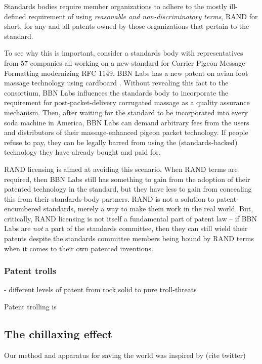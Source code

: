 \documentclass[acmtocl]%
{boviktrans}
\begin{document}
Standards bodies require member organizations to adhere to the mostly
ill-defined requirement of using {\it reasonable and
  non-discriminatory terms}, RAND for short, for any and all patents
owned by those organizations that pertain to the standard.

To see why this is important, consider a standards body with
representatives from 57 companies all working on a new standard for
Carrier Pigeon Message Formatting modernizing RFC 1149. BBN Labs has a
new patent on avian foot massage technology using cardboard
\cite{ebert}. Without revealing this fact to the consortium, BBN Labs
influences the standards body to incorporate the requirement for
post-packet-delivery corrugated massage as a quality assurance
mechanism. Then, after waiting for the standard to be incorporated
into every soda machine in America, BBN Labs can demand arbitrary fees
from the users and distributors of their massage-enhanced pigeon
packet technology. If people refuse to pay, they can be legally barred
from using the (standards-backed) technology they have already bought
and paid for.

RAND licensing is aimed at avoiding this scenario. When
RAND terms are required, then BBN Labs still has something to gain
from the adoption of their patented technology in the standard, but
they have less to gain from concealing this from their standards-body
partners. RAND is not a solution to patent-encumbered standards,
merely a way to make them work in the real world. But, critically,
RAND licensing is not itself a fundamental part of patent law -- if
BBN Labs are {\it not} a part of the standards committee, then they can
still wield their patents despite the standards committee members
being bound by RAND terms when it comes to their own patented
inventions. 

\subsubsection{Patent trolls}

- different levels of patent from rock solid to pure troll-threats

Patent trolling is 

\subsection{The chillaxing effect}

Our method and apparatus for saving the world was inspired by
(cite twitter)
\end{document}
